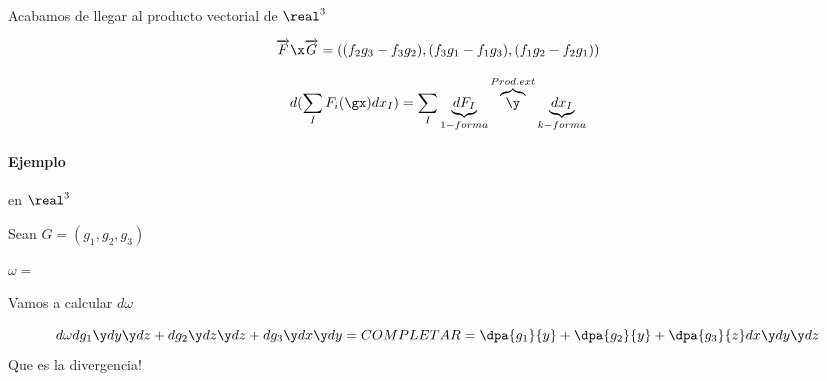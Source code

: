 \obs Acabamos de llegar al producto vectorial de $\real^3$ 

\[\overrightarrow{F}\x\overrightarrow{G} = 
\left((f_2g_3-f_3g_2),(f_3g_1-f_1g_3),(f_1g_2 - f_2g_1)\right)\]

\begin{defn}

\[d(\sum_I F_i(\gx)dx_I) = \sum_I \underbrace{dF_I}_{1-forma} \overbrace{\y}^{Prod.ext} \underbrace{dx_I}_{k-forma}\]
\end{defn}

\paragraph{Ejemplo} en $\real^3$

Sean $G = (g_1,g_2,g_3)$

$\omega = $

Vamos a calcular $d\omega$

\[d\omega dg_1\y dy\y dz + dg_2 \y dz\y dz + dg_3 \y dx \y dy = COMPLETAR = \dpa{g_1}{y} + \dpa{g_2}{y}+\dpa{g_3}{z}dx\y dy\y dz\] Que es la divergencia!